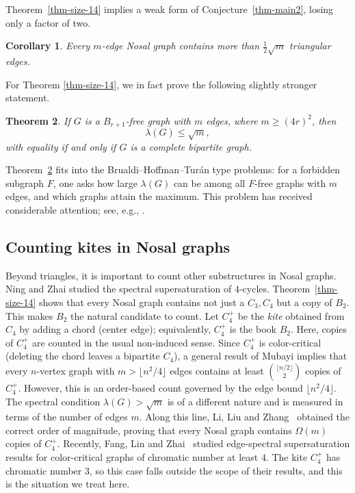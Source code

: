 \documentclass[10pt,a4paper]{amsart}
\newtheorem{theorem}{Theorem}[section]
\newtheorem{corollary}[theorem]{Corollary}
\renewcommand{\le}{\leqslant}
\renewcommand{\ge}{\geqslant}
\begin{document}
\medskip 
Theorem~\ref{thm-size-14} implies a weak form of
Conjecture~\ref{thm-main2}, losing only a factor of two. 

\begin{corollary}
Every $m$-edge Nosal graph contains more than $\tfrac{1}{2}\sqrt{m}$
triangular edges. 
\end{corollary}


For Theorem \ref{thm-size-14}, 
we in fact prove the following slightly stronger statement. 

\begin{theorem} \label{thm:book-free}
If $G$ is a $B_{r+1}$-free graph with $m$ edges, where $m\ge (4r)^2$, then
$$ \lambda(G)\le\sqrt{m}, $$
with equality if and only if $G$ is a complete bipartite
graph.
\end{theorem}


 Theorem~\ref{thm:book-free} fits into the Brualdi--Hoffman--Tur\'{a}n type
problems: for a forbidden subgraph $F$, one asks how large $\lambda(G)$
can be among all $F$-free graphs with $m$ edges, and which graphs attain the
maximum. 
This problem has received considerable
attention; see, e.g.,  
\cite{ZLS2021, LZS2024, LZZ2025jgt, LLLY2026aam, LLZ-edge-spectral}.  


\subsection{Counting kites in Nosal graphs}

Beyond triangles, it is important to count other  substructures in Nosal graphs. 
 Ning and Zhai \cite{NZ2021b} studied the spectral supersaturation of $4$-cycles. 
Theorem~\ref{thm-size-14} shows that every Nosal graph contains not just a $C_3, C_4$ but a
copy of $B_2$. This makes $B_2$
the natural candidate to count. Let $C_4^+$ be the \emph{kite} obtained from $C_4$ by adding a chord (center edge); equivalently, $C_4^+$ is the book $B_2$. 
Here, copies of \(C_4^+\) are counted in the
usual non-induced sense. 
Since $C_4^+$ is color-critical (deleting the chord leaves a bipartite
$C_4$), a general result of Mubayi \cite{Mubayi2010} implies that 
every $n$-vertex graph with $m> \lfloor n^2/4\rfloor$ edges contains at least ${\lfloor n/2 \rfloor \choose 2}$ copies of $C_4^+$. However, 
this is an order-based count governed by the edge bound $\lfloor n^2/4\rfloor$.
The spectral condition $\lambda(G)>\sqrt{m}$ is of a different nature and is measured in terms of the number of edges $m$.   
Along this line, Li, Liu and Zhang~\cite{LiLiuZhang26} obtained the correct order of magnitude, proving that every Nosal graph contains $\Omega(m)$ copies of $C_4^+$. 
Recently, Fang, Lin and Zhai~\cite{FangLinZhai} studied edge-spectral
supersaturation results for color-critical graphs of chromatic number at least
$4$. The kite $C_4^+$ has chromatic number $3$, so this case falls outside the scope of their results, and this is the situation we treat here.
\end{document}
